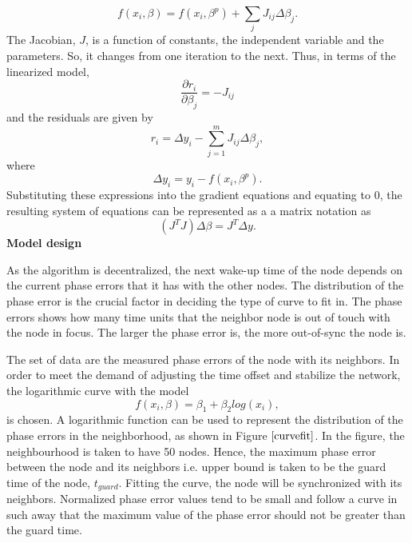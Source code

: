 \documentclass[journal]{IEEEtran}
\begin{document}
\begin{equation}
 f(x_i,\beta) =f(x_i, \beta^p)+\sum_j J_{ij} \Delta\beta_j.
\end{equation}
The Jacobian, $J$, is a function of constants, the independent
variable and the parameters. So, it changes from one iteration to the
next. Thus, in terms of the linearized model,
\begin{equation}
\frac{\partial r_i}{\partial \beta_j}=-J_{ij}
\end{equation}
and the residuals are given by
\begin{equation}
    r_i=\Delta y_i- \sum_{j=1}^{m} J_{ij}\Delta\beta_j,
\end{equation}
where
\begin{equation}
 \Delta y_i=y_i- f(x_i, \beta^p).
\end{equation}
Substituting these expressions into the gradient equations and
equating to $0$, the resulting system of equations can be represented as a a matrix notation as
\begin{equation}
    \left(J^TJ\right)\Delta  \beta=J^T\Delta y.
\end{equation}
\textbf{Model design} \par
As the algorithm is decentralized, the next wake-up time of the node depends on
the current phase errors that it has with the other nodes. The distribution of the phase error is the crucial factor in deciding the type of curve to fit in. The phase errors shows how many time units that the neighbor node is out of touch with the node in focus. The larger the phase error is, the more out-of-sync the node is.\par
The set of data are the measured phase errors of the node with its neighbors.
In order to meet the demand of adjusting the time offset and stabilize the network, the logarithmic curve with the model
\begin{equation}
 f(x_i,\beta)= \beta _1 + \beta_2log(x_i),
\end{equation}
is chosen. A logarithmic function can be used to represent the distribution of the phase errors in the neighborhood, as shown in Figure $\ref{curvefit}$. In the figure, the neighbourhood is taken to have 50 nodes. Hence, the maximum phase error between the node and its neighbors i.e. upper bound is taken to be the guard time of the node, $t_{guard}$. Fitting the curve, the node will be synchronized with its neighbors. Normalized phase error values tend to be small and follow a curve in such away that the maximum value of the phase error should not be greater than the guard time.
\end{document}
